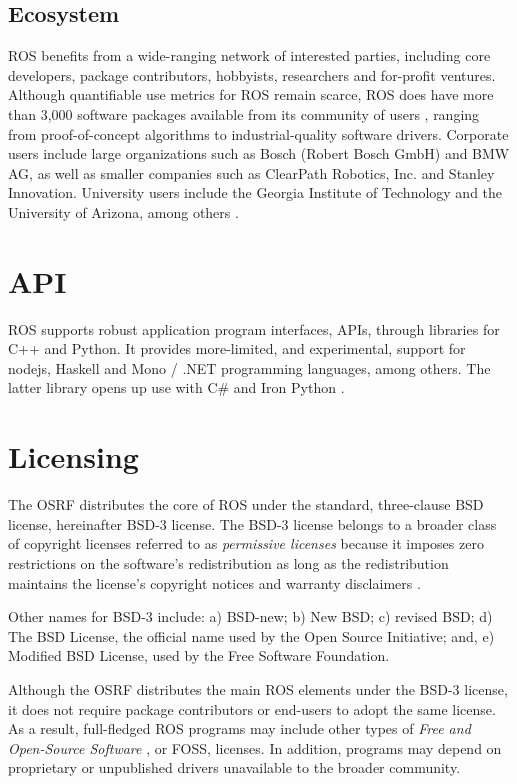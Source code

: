 \documentclass[9pt,twocolumn,twoside]{../../styles/osajnl}
\begin{document}
\subsection{Ecosystem}
ROS benefits from a wide-ranging network of interested parties, including core developers, package contributors, hobbyists, researchers and for-profit ventures.  Although quantifiable use metrics for ROS remain scarce, ROS does have more than 3,000 software packages available from its community of users \cite{www-ros-why}, ranging from proof-of-concept algorithms to industrial-quality software drivers.  Corporate users include large organizations such as Bosch (Robert Bosch GmbH) and BMW AG, as well as smaller companies such as ClearPath Robotics, Inc. and Stanley Innovation.  University users include the Georgia Institute of Technology and the University of Arizona, among others \cite{www-ros-ecosystem}.  

\section{API}

ROS supports robust application program interfaces, APIs, through libraries for C++ and Python.  It provides more-limited, and experimental, support for nodejs, Haskell and Mono / .NET programming languages, among others.  The latter library opens up use with C\# and Iron Python \cite{www-ros-api}.

\section{Licensing}

The OSRF distributes the core of ROS under the standard, three-clause BSD license, hereinafter BSD-3 license.  The BSD-3 license belongs to a broader class of copyright licenses referred to as \textit{permissive licenses} because it imposes zero restrictions on the software's redistribution as long as the redistribution maintains the license's copyright notices and warranty disclaimers \cite{www-wikipedia-bsd}.

Other names for BSD-3 include: a) BSD-new; b) New BSD; c) revised BSD; d) The BSD License, the official name used by the Open Source Initiative; and, e) Modified BSD License, used by the Free Software Foundation.

Although the OSRF distributes the main ROS elements under the BSD-3 license, it does not require package contributors or end-users to adopt the same license.  As a result, full-fledged ROS programs may include other types of \textit{Free and Open-Source Software} \cite{www-wiki-foss}, or FOSS, licenses.  In addition, programs may depend on proprietary or unpublished drivers unavailable to the broader community.
\end{document}

